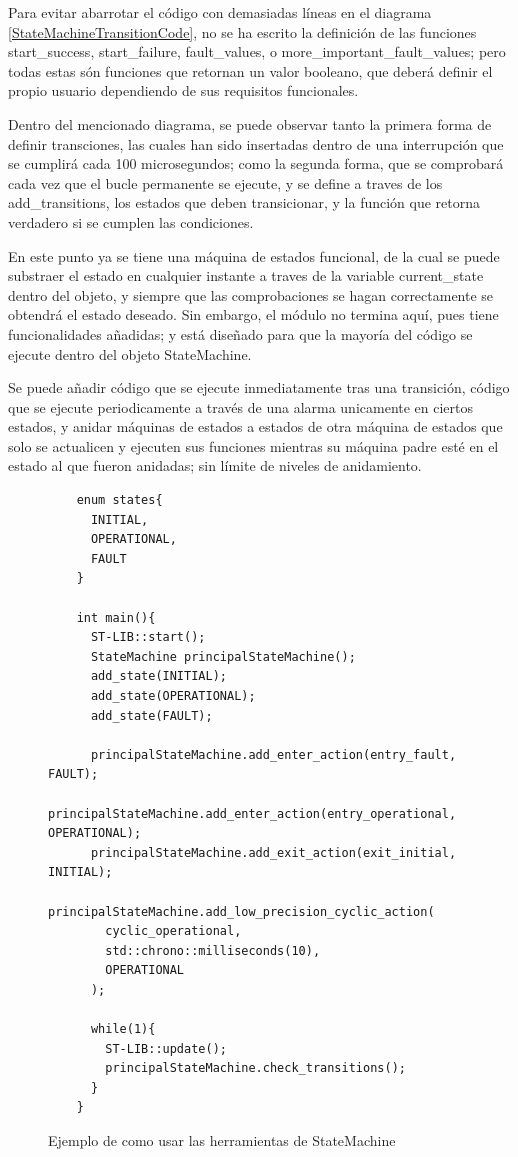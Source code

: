 \documentclass{report}
\begin{document}
Para evitar abarrotar el código con demasiadas líneas en el diagrama \ref{StateMachineTransitionCode}, no se ha escrito la definición de las funciones start\_success, start\_failure, fault\_values, o more\_important\_fault\_values; pero todas estas són funciones que retornan un valor booleano, que deberá definir el propio usuario dependiendo de sus requisitos funcionales. \par
Dentro del mencionado diagrama, se puede observar tanto la primera forma de definir transciones, las cuales han sido insertadas dentro de una interrupción que se cumplirá cada 100 microsegundos; como la segunda forma, que se comprobará cada vez que el bucle permanente se ejecute, y se define a traves de los add\_transitions, los estados que deben transicionar, y la función que retorna verdadero si se cumplen las condiciones. 
\par \vspace{0.3cm}
En este punto ya se tiene una máquina de estados funcional, de la cual se puede substraer el estado en cualquier instante a traves de la variable current\_state dentro del objeto, y siempre que las comprobaciones se hagan correctamente se obtendrá el estado deseado. Sin embargo, el módulo no termina aquí, pues tiene funcionalidades añadidas; y está diseñado para que la mayoría del código se ejecute dentro del objeto StateMachine. 
\par \vspace{0.3cm}
Se puede añadir código que se ejecute inmediatamente tras una transición, código que se ejecute periodicamente a través de una alarma unicamente en ciertos estados, y anidar máquinas de estados a estados de otra máquina de estados que solo se actualicen y ejecuten sus funciones mientras su máquina padre esté en el estado al que fueron anidadas; sin límite de niveles de anidamiento. 
\begin{figure}[h]
  \begin{lstlisting}
    enum states{
      INITIAL,
      OPERATIONAL,
      FAULT
    }

    int main(){
      ST-LIB::start();
      StateMachine principalStateMachine();
      add_state(INITIAL);
      add_state(OPERATIONAL);
      add_state(FAULT);

      principalStateMachine.add_enter_action(entry_fault, FAULT);
      principalStateMachine.add_enter_action(entry_operational, OPERATIONAL);
      principalStateMachine.add_exit_action(exit_initial, INITIAL);
      principalStateMachine.add_low_precision_cyclic_action(
        cyclic_operational, 
        std::chrono::milliseconds(10),
        OPERATIONAL
      );

      while(1){
        ST-LIB::update();
        principalStateMachine.check_transitions();
      }
    }
  \end{lstlisting}
  \caption{Ejemplo de como usar las herramientas de StateMachine}
  \label{StateMachineUtilitiesCode}
\end{figure}
\par \vspace{0.3cm}
\end{document}
